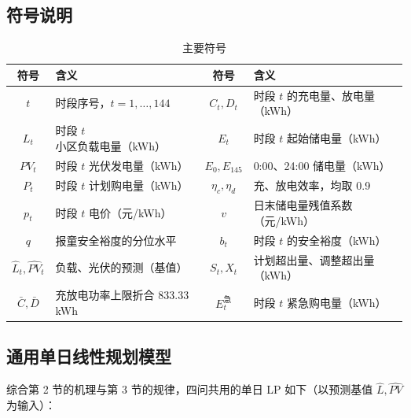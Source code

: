 \subsection{符号说明}

\begin{table}[htbp]
\centering
\caption{主要符号}
\label{tab:symbols}
\begin{tabular}{@{}clcl@{}}
\toprule
符号 & 含义 & 符号 & 含义 \\
\midrule
$t$ & 时段序号\nobreak，$t=1,\dots,144$ & $C_t,D_t$ & 时段 $t$ 的充电量\nobreak、放电量（kWh\nobreak）\\
$L_t$ & 时段 $t$ 小区负载电量（kWh\nobreak） & $E_t$ & 时段 $t$ 起始储电量（kWh\nobreak）\\
$PV_t$ & 时段 $t$ 光伏发电量（kWh\nobreak） & $E_0,E_{145}$ & 0:00\nobreak、24:00 储电量（kWh\nobreak）\\
$P_t$ & 时段 $t$ 计划购电量（kWh\nobreak） & $\eta_c,\eta_d$ & 充\nobreak、放电效率\nobreak，均取 0.9\\
$p_t$ & 时段 $t$ 电价（元/kWh\nobreak） & $v$ & 日末储电量残值系数（元/kWh\nobreak）\\
$q$ & 报童安全裕度的分位水平 & $b_t$ & 时段 $t$ 的安全裕度（kWh\nobreak）\\
$\hat L_t,\hat{PV}_t$ & 负载\nobreak、光伏的预测（基值\nobreak） & $S_t,X_t$ & 计划超出量\nobreak、调整超出量（kWh\nobreak）\\
$\bar C,\bar D$ & 充放电功率上限折合 833.33 kWh & $E_t^{\text{急}}$ & 时段 $t$ 紧急购电量（kWh\nobreak）\\
\bottomrule
\end{tabular}
\end{table}

\subsection{通用单日线性规划模型}

综合第 2 节的机理与第 3 节的规律\nobreak，四问共用的单日 LP 如下（以预测基值 $\hat L,\hat{PV}$ 为输入\nobreak）\nobreak：

